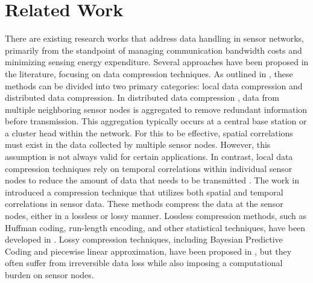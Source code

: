 \section{Related Work}
\label{secii}

There are existing research works that address data handling in sensor networks, primarily from the standpoint of managing communication bandwidth costs and minimizing sensing energy expenditure. Several approaches have been proposed in the literature, focusing on data compression techniques. As outlined in \cite{ketshabetswe2021data}, these methods can be divided into two primary categories: local data compression and distributed data compression. In distributed data compression \cite{abbasian2020survey, arumugam2015ee, halder2019limca, chen2019layered}, data from multiple neighboring sensor nodes is aggregated to remove redundant information before transmission. This aggregation typically occurs at a central base station or a cluster head within the network. For this to be effective, spatial correlations must exist in the data collected by multiple sensor nodes. However, this assumption is not always valid for certain applications. In contrast, local data compression techniques rely on temporal correlations within individual sensor nodes to reduce the amount of data that needs to be transmitted \cite{cao2020multi, jarwan2019data}. The work in \cite{chen2019hierarchical} introduced a compression technique that utilizes both spatial and temporal correlations in sensor data. These methods compress the data at the sensor nodes, either in a lossless or lossy manner. Lossless compression methods, such as Huffman coding, run-length encoding, and other statistical techniques, have been developed in \cite{saidani2019new, gao2022application, ahmad2019lossless}. Lossy compression techniques, including Bayesian Predictive Coding and piecewise linear approximation, have been proposed in \cite{chen2020new, roy2022limited}, but they often suffer from irreversible data loss while also imposing a computational burden on sensor nodes.

